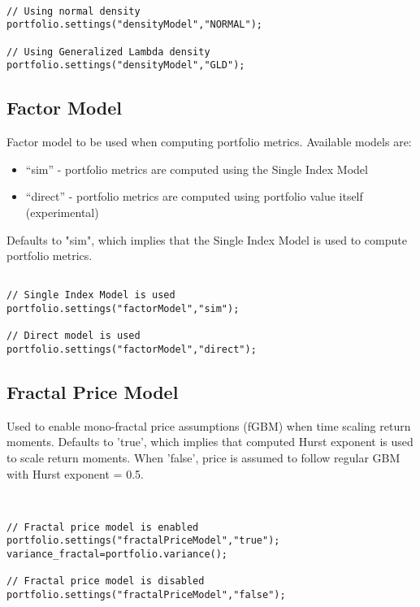 \documentclass[letterpaper]{report}
\newcounter{N}
\begin{document}
\begin{lstlisting}

// Using normal density
portfolio.settings("densityModel","NORMAL");

// Using Generalized Lambda density
portfolio.settings("densityModel","GLD");

\end{lstlisting}

\subsection {Factor Model}
Factor model to be used when computing portfolio metrics. Available models are: 
  \begin{itemize} 
\item ``sim'' - portfolio metrics are computed using the Single Index Model
\item ``direct'' - portfolio metrics are computed using portfolio value itself
(experimental)
\end{itemize}
Defaults to "sim", which implies that the Single Index Model is used to compute portfolio metrics.

\begin{lstlisting}

// Single Index Model is used
portfolio.settings("factorModel","sim");

// Direct model is used
portfolio.settings("factorModel","direct");

\end{lstlisting}


\subsection {Fractal Price Model}
Used to enable mono-fractal price assumptions (fGBM) when time scaling return moments.  
Defaults to 'true', which implies that computed Hurst exponent is used to scale return moments. 
When 'false', price is assumed to follow regular GBM with Hurst exponent = 0.5.

\begin{lstlisting}


// Fractal price model is enabled
portfolio.settings("fractalPriceModel","true");
variance_fractal=portfolio.variance();

// Fractal price model is disabled
portfolio.settings("fractalPriceModel","false");

\end{lstlisting}
\end{document}
